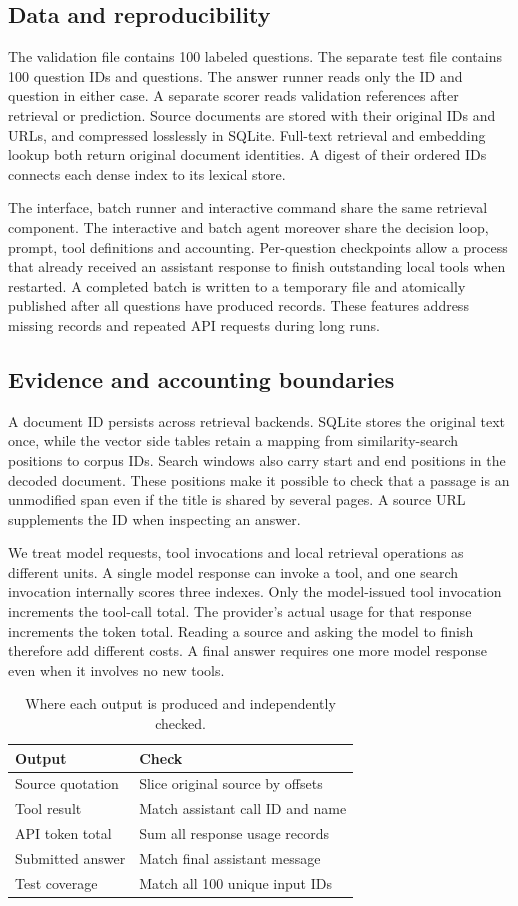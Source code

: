 \documentclass[sigconf]{acmart}
\begin{document}
\subsection{Data and reproducibility}
The validation file contains 100 labeled questions. The separate test file contains 100 question IDs and questions. The answer runner reads only the ID and question in either case. A separate scorer reads validation references after retrieval or prediction. Source documents are stored with their original IDs and URLs, and compressed losslessly in SQLite. Full-text retrieval and embedding lookup both return original document identities. A digest of their ordered IDs connects each dense index to its lexical store.

The interface, batch runner and interactive command share the same retrieval component. The interactive and batch agent moreover share the decision loop, prompt, tool definitions and accounting. Per-question checkpoints allow a process that already received an assistant response to finish outstanding local tools when restarted. A completed batch is written to a temporary file and atomically published after all questions have produced records. These features address missing records and repeated API requests during long runs.
\subsection{Evidence and accounting boundaries}
A document ID persists across retrieval backends. SQLite stores the original text once, while the vector side tables retain a mapping from similarity-search positions to corpus IDs. Search windows also carry start and end positions in the decoded document. These positions make it possible to check that a passage is an unmodified span even if the title is shared by several pages. A source URL supplements the ID when inspecting an answer.

We treat model requests, tool invocations and local retrieval operations as different units. A single model response can invoke a tool, and one search invocation internally scores three indexes. Only the model-issued tool invocation increments the tool-call total. The provider's actual usage for that response increments the token total. Reading a source and asking the model to finish therefore add different costs. A final answer requires one more model response even when it involves no new tools.

\begin{table}[h]\centering\caption{Where each output is produced and independently checked.}\small\begin{tabular}{ll}\toprule Output & Check\\\midrule
Source quotation & Slice original source by offsets\\
Tool result & Match assistant call ID and name\\
API token total & Sum all response usage records\\
Submitted answer & Match final assistant message\\
Test coverage & Match all 100 unique input IDs\\\bottomrule\end{tabular}\end{table}
\clearpage
\end{document}
